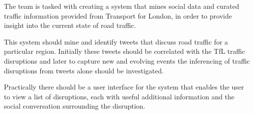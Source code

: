 The team is tasked with creating a system that mines social data and curated
traffic information provided from Transport for London, in order to provide
insight into the current state of road traffic.

This system should mine and identify tweets that discuss road traffic for a
particular region. Initially these tweets should be correlated with the TfL
traffic disruptions and later to capture new and evolving events the inferencing of
traffic disruptions from tweets alone should be investigated.

Practically there should be a user interface for the system that enables the
user to view a list of disruptions, each with useful additional information
and the social conversation surrounding the disruption.
